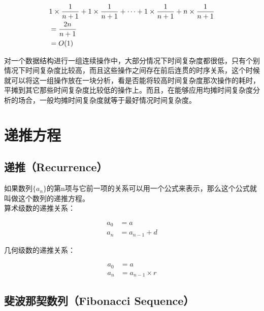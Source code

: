 \begin{align*}
     & 1 \times {1 \over n+1} + 1 \times {1 \over n+1} + \dots + 1 \times {1 \over n+1} + n \times {1 \over n+1} \\
     & = {2n \over n+1}                                                                                          \\
     & = O(1)
\end{align*}

对一个数据结构进行一组连续操作中，大部分情况下时间复杂度都很低，只有个别情况下时间复杂度比较高，而且这些操作之间存在前后连贯的时序关系，这个时候就可以将这一组操作放在一块分析，看是否能将较高时间复杂度那次操作的耗时，平摊到其它那些时间复杂度比较低的操作上。而且，在能够应用均摊时间复杂度分析的场合，一般均摊时间复杂度就等于最好情况时间复杂度。

\newpage

\section{递推方程}

\subsection{递推（Recurrence）}

如果数列$ \{a_n\} $的第n项与它前一项的关系可以用一个公式来表示，那么这个公式就叫做这个数列的递推方程。 \\

算术级数的递推关系：

\vspace{-1cm}

\begin{align*}
    a_0 & = a           \\
    a_n & = a_{n-1} + d
\end{align*}

几何级数的递推关系：

\vspace{-1cm}

\begin{align*}
    a_0 & = a                \\
    a_n & = a_{n-1} \times r
\end{align*}

\subsection{斐波那契数列（Fibonacci Sequence）}

